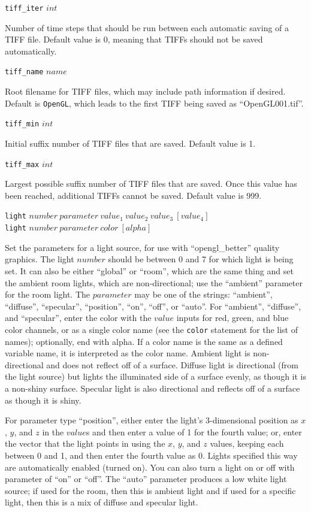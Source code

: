 \documentclass {scrbook}
\newcommand {\ttt} {\texttt}
\begin{document}
\begin{description}
\item{\ttt{tiff\_iter} $int$}

Number of time steps that should be run between each automatic saving of a TIFF file. Default value is 0, meaning that TIFFs should not be saved automatically.

\item{\ttt{tiff\_name} $name$}

Root filename for TIFF files, which may include path information if desired. Default is \ttt{OpenGL}, which leads to the first TIFF being saved as ``OpenGL001.tif''.

\item{\ttt{tiff\_min} $int$}

Initial suffix number of TIFF files that are saved. Default value is 1.

\item{\ttt{tiff\_max} $int$}

Largest possible suffix number of TIFF files that are saved. Once this value has been reached, additional TIFFs cannot be saved. Default value is 999.

\item{\ttt{light} $number\ parameter\ value_1\ value_2\ value_3\ [value_4]$\\
\ttt{light} $number\ parameter\ color\ [alpha]$}

Set the parameters for a light source, for use with ``opengl\_better'' quality graphics. The light $number$ should be between 0 and 7 for which light is being set. It can also be either ``global'' or ``room'', which are the same thing and set the ambient room lights, which are non-directional; use the ``ambient'' parameter for the room light. The $parameter$ may be one of the strings: ``ambient'', ``diffuse'', ``specular'', ``position'', ``on'', ``off'', or ``auto''. For ``ambient'', ``diffuse'', and ``specular'', enter the color with the $value$ inputs for red, green, and blue color channels, or as a single color name (see the \ttt{color} statement for the list of names); optionally, end with alpha. If a color name is the same as a defined variable name, it is interpreted as the color name. Ambient light is non-directional and does not reflect off of a surface. Diffuse light is directional (from the light source) but lights the illuminated side of a surface evenly, as though it is a non-shiny surface. Specular light is also directional and reflects off of a surface as though it is shiny.

For parameter type ``position'', either enter the light's 3-dimensional position as $x$, $y$, and $z$ in the $value$s and then enter a value of 1 for the fourth value; or, enter the vector that the light points in using the $x$, $y$, and $z$ values, keeping each between 0 and 1, and then enter the fourth value as 0. Lights specified this way are automatically enabled (turned on). You can also turn a light on or off with parameter of ``on'' or ``off''. The ``auto'' parameter produces a low white light source; if used for the room, then this is ambient light and if used for a specific light, then this is a mix of diffuse and specular light.


\end{description}
\end{document}
